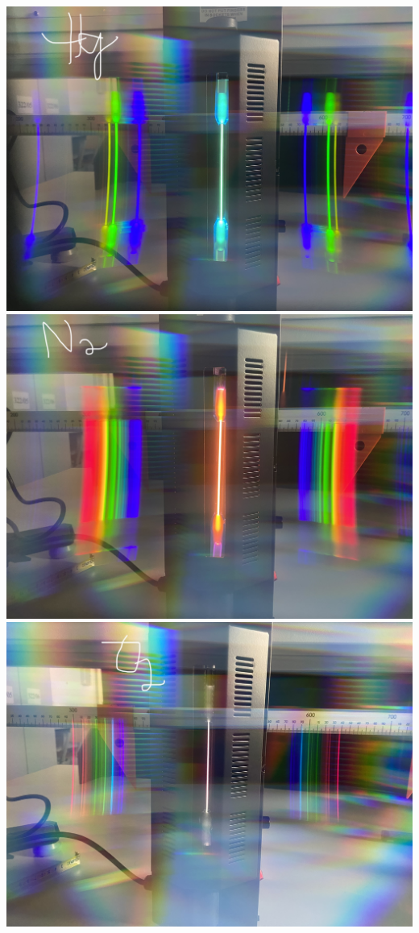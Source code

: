 \documentclass[12pt,oneside,oldfontcommands]{memoir}
\begin{document}
\includegraphics[width=.96\columnwidth]{figures/IMG_5293.jpg}
\includegraphics[width=.96\columnwidth]{figures/IMG_5294.jpg}
\includegraphics[width=.96\columnwidth]{figures/IMG_5295.jpg}
\end{document}
